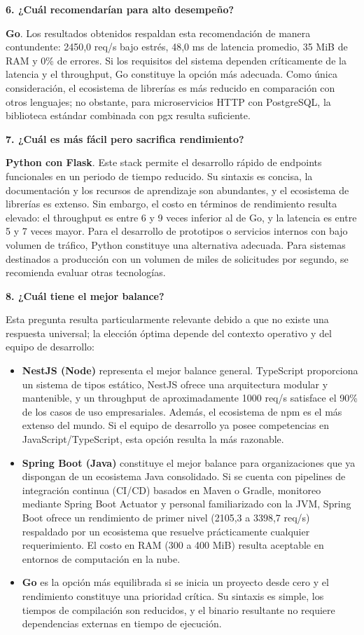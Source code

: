\documentclass[12pt,a4paper]{article}
\begin{document}
\textbf{6. ¿Cuál recomendarían para alto desempeño?}

\textbf{Go}. Los resultados obtenidos respaldan esta recomendación de manera contundente: 2450,0 req/s bajo estrés, 48,0 ms de latencia promedio, 35 MiB de RAM y 0\% de errores. Si los requisitos del sistema dependen críticamente de la latencia y el throughput, Go constituye la opción más adecuada. Como única consideración, el ecosistema de librerías es más reducido en comparación con otros lenguajes; no obstante, para microservicios HTTP con PostgreSQL, la biblioteca estándar combinada con pgx resulta suficiente.

\textbf{7. ¿Cuál es más fácil pero sacrifica rendimiento?}

\textbf{Python con Flask}. Este stack permite el desarrollo rápido de endpoints funcionales en un periodo de tiempo reducido. Su sintaxis es concisa, la documentación y los recursos de aprendizaje son abundantes, y el ecosistema de librerías es extenso. Sin embargo, el costo en términos de rendimiento resulta elevado: el throughput es entre 6 y 9 veces inferior al de Go, y la latencia es entre 5 y 7 veces mayor. Para el desarrollo de prototipos o servicios internos con bajo volumen de tráfico, Python constituye una alternativa adecuada. Para sistemas destinados a producción con un volumen de miles de solicitudes por segundo, se recomienda evaluar otras tecnologías.

\textbf{8. ¿Cuál tiene el mejor balance?}

Esta pregunta resulta particularmente relevante debido a que no existe una respuesta universal; la elección óptima depende del contexto operativo y del equipo de desarrollo:

\begin{itemize}
    \item \textbf{NestJS (Node)} representa el mejor balance general. TypeScript proporciona un sistema de tipos estático, NestJS ofrece una arquitectura modular y mantenible, y un throughput de aproximadamente 1000 req/s satisface el 90\% de los casos de uso empresariales. Además, el ecosistema de npm es el más extenso del mundo. Si el equipo de desarrollo ya posee competencias en JavaScript/TypeScript, esta opción resulta la más razonable.
    \item \textbf{Spring Boot (Java)} constituye el mejor balance para organizaciones que ya dispongan de un ecosistema Java consolidado. Si se cuenta con pipelines de integración continua (CI/CD) basados en Maven o Gradle, monitoreo mediante Spring Boot Actuator y personal familiarizado con la JVM, Spring Boot ofrece un rendimiento de primer nivel (2105,3 a 3398,7 req/s) respaldado por un ecosistema que resuelve prácticamente cualquier requerimiento. El costo en RAM (300 a 400 MiB) resulta aceptable en entornos de computación en la nube.
    \item \textbf{Go} es la opción más equilibrada si se inicia un proyecto desde cero y el rendimiento constituye una prioridad crítica. Su sintaxis es simple, los tiempos de compilación son reducidos, y el binario resultante no requiere dependencias externas en tiempo de ejecución.
\end{itemize}
\end{document}
